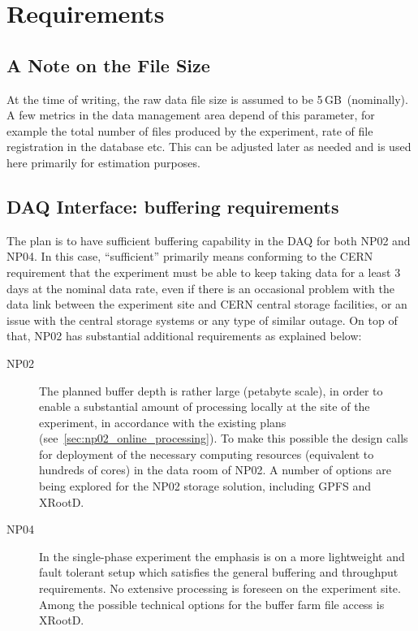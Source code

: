 \documentclass[pdftex,12pt,letter]{article}
\newcommand{\filesize}{5\,GB\ }
\begin{document}
\section{Requirements}
\subsection{A Note on the File Size}
At the time of writing, the raw data file size is assumed to be \filesize (nominally). A few metrics in the data management area depend of this
parameter, for example the total number of files produced by the experiment, rate of file registration in the database etc. This can be adjusted
later as needed and is used here primarily for estimation purposes.

\subsection{DAQ Interface: buffering requirements}
\label{sec:daq_interface}
The plan is to have sufficient buffering capability in the DAQ for both NP02 and NP04. In this case, ``sufficient''
primarily means conforming to the CERN requirement that the experiment must be able to keep taking data for a
least 3 days at the nominal data rate, even if there is an occasional problem with the data link between the
experiment site and CERN central storage facilities, or an issue with the central storage systems or any type of similar outage.
On top of that, NP02 has substantial additional requirements as explained below:
\begin{description}

\item[NP02] The planned buffer depth is rather large (petabyte scale), in order to enable a substantial amount of
processing locally at the site of the experiment, in accordance with the existing plans (see~\ref{sec:np02_online_processing}).
 To make this possible the design calls
for deployment of the necessary computing resources (equivalent to hundreds of cores) in the data room of NP02. A number of options are being explored
for the NP02  storage solution, including GPFS and XRootD.

\item[ NP04] In the single-phase experiment the emphasis is on a more lightweight and fault tolerant setup which satisfies the general buffering and throughput requirements.
No extensive processing is foreseen on the experiment site. Among the possible technical options for the buffer farm file access is XRootD.
\end{description}
\end{document}

